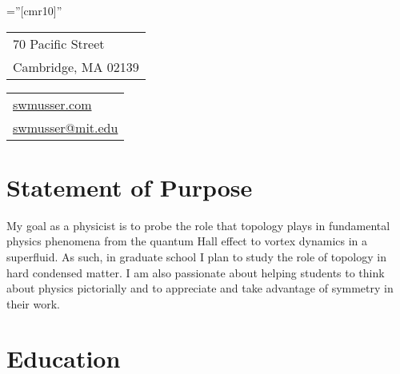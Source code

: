 \documentclass[10pt]{article} %
\begin{document}
\newcommand{\com}[1]{}

\pagestyle{empty} %

\font\fb=''[cmr10]'' %

\par{\bigskip\par} %



\begin{tabular}[t]{@{}l} 
  70 Pacific Street\\
  Cambridge, MA 02139
\end{tabular}
\hfill%
\begin{tabular}[t]{l@{}}
	\href{https://swmusser.com}{swmusser.com}\\
	\href{mailto:swmusser@mit.edu}{swmusser@mit.edu}
\end{tabular}


\section{Statement of Purpose}

My goal as a physicist is to probe the role that topology plays in fundamental physics phenomena from the quantum Hall effect to vortex dynamics in a superfluid.  As such, in graduate school I plan to study the role of topology in hard condensed matter.  I am also passionate about helping students to think about physics pictorially and to appreciate and take advantage of symmetry in their work.



\section{Education}
\end{document}
